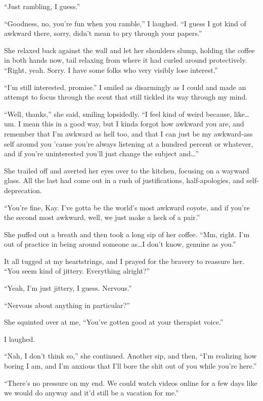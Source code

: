 ``Just rambling, I guess.''

``Goodness, no, you're fun when you ramble,'' I laughed. ``I guess I got kind of awkward there, sorry, didn't mean to pry through your papers.''

She relaxed back against the wall and let her shoulders slump, holding the coffee in both hands now, tail relaxing from where it had curled around protectively. ``Right, yeah. Sorry. I have some folks who very visibly lose interest.''

``I'm still interested, promise.'' I smiled as disarmingly as I could and made an attempt to focus through the scent that still tickled its way through my mind.

``Well, thanks,'' she said, smiling lopsidedly. ``I feel kind of weird because, like\ldots um. I mean this in a good way, but I kinda forgot how awkward you are, and remember that I'm awkward as hell too, and that I can just be my awkward-ass self around you 'cause you're always listening at a hundred percent or whatever, and if you're uninterested you'll just change the subject and\ldots{}''

She trailed off and averted her eyes over to the kitchen, focusing on a wayward glass. All the last had come out in a rush of justifications, half-apologies, and self-deprecation.

``You're fine, Kay. I've gotta be the world's most awkward coyote, and if you're the second most awkward, well, we just make a heck of a pair.''

She puffed out a breath and then took a long sip of her coffee. ``Mm, right. I'm out of practice in being around someone as\ldots I don't know, genuine as you.''

It all tugged at my heartstrings, and I prayed for the bravery to reassure her. ``You seem kind of jittery. Everything alright?''

``Yeah, I'm just jittery, I guess. Nervous.''

``Nervous about anything in particular?''

She squinted over at me, ``You've gotten good at your therapist voice.''

I laughed.

``Nah, I don't think so,'' she continued. Another sip, and then, ``I'm realizing how boring I am, and I'm anxious that I'll bore the shit out of you while you're here.''

``There's no pressure on my end. We could watch videos online for a few days like we would do anyway and it'd still be a vacation for me.''

